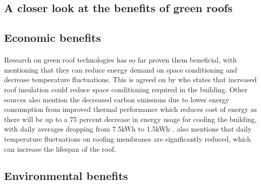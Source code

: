\documentclass{article}
\begin{document}
\begin{multicols}{2}
  \section{A closer look at the benefits of green roofs} \label{sec:benef}
  \subsection{Economic benefits}
  \paragraph{} Research on green roof technologies has so far proven them
  beneficial, with  mentioning that they can reduce energy
  demand on space conditioning and decrease temperature fluctuations. This
  is agreed on by  who states that increased roof insulation
  could reduce space conditioning required in the building. Other
  sources also mention the decreased carbon emissions due to lower energy
  consumption from improved thermal performance \cite{CommAwareGBSyd}
  which reduces cost of energy as there will be up to a 75 percent
  decrease in energy usage for cooling the building, with daily averages
  dropping from 7.5kWh to 1.5kWh \cite{energeff}.  also
  mentions that daily temperature fluctuations on roofing membranes are
  significantly reduced, which can increase the lifespan of the roof.


  \subsection{Environmental benefits}

\end{multicols}
\end{document}
